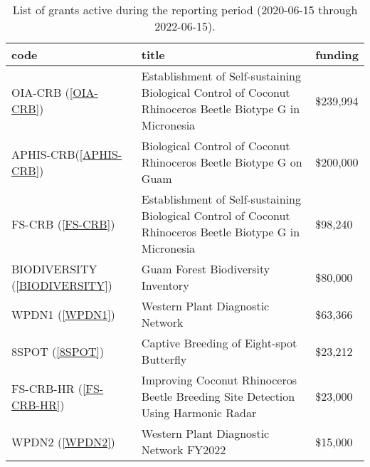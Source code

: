 \begin{table}[h!]
	\centering
	\caption{List of grants active during the reporting period (2020-06-15 through 2022-06-15).}
	\label{grantlist}
	\begin{tabular}{lp{3in}>{\raggedleft\arraybackslash}l}
		\toprule
		code &                                                                                                    title &  funding \\
		\midrule
		OIA-CRB (\ref{OIA-CRB}) & Establishment of Self-sustaining Biological Control of Coconut Rhinoceros Beetle Biotype G in Micronesia & \$239,994 \\
		\midrule
		APHIS-CRB(\ref{APHIS-CRB}) &                                        Biological Control of Coconut Rhinoceros Beetle Biotype G on Guam & \$200,000 \\
		\midrule		
		FS-CRB (\ref{FS-CRB})& Establishment of Self-sustaining Biological Control of Coconut Rhinoceros Beetle Biotype G in Micronesia &  \$98,240 \\
		\midrule
		BIODIVERSITY (\ref{BIODIVERSITY}) &                                                                       Guam Forest Biodiversity Inventory &  \$80,000 \\
		\midrule		
		WPDN1 (\ref{WPDN1}) &                                                                         Western Plant Diagnostic Network &  \$63,366 \\
		\midrule
		8SPOT (\ref{8SPOT}) &                                                                 Captive Breeding of Eight-spot Butterfly &  \$23,212 \\
		\midrule
		FS-CRB-HR (\ref{FS-CRB-HR})&                         Improving Coconut Rhinoceros Beetle Breeding Site Detection Using Harmonic Radar &  \$23,000 \\
		\midrule
		WPDN2 (\ref{WPDN2}) &                                                                  Western Plant Diagnostic Network FY2022 &  \$15,000 \\
		\bottomrule
	\end{tabular}
\end{table}

